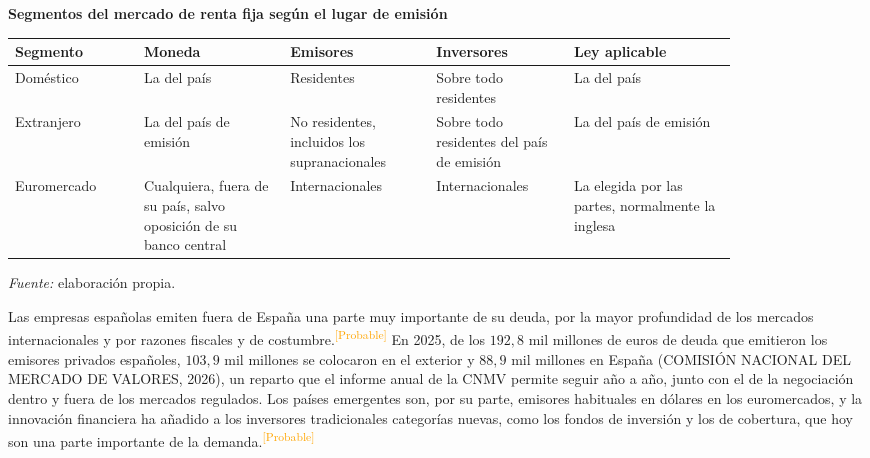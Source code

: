 \documentclass[10pt,a4paper]{article}
\begin{document}
\begin{center}\begin{minipage}{\linewidth}\centering
{\small\textbf{Segmentos del mercado de renta fija según el lugar de emisión}}\par\vspace{0.5em}
{\small\begin{tabular}{p{0.15\linewidth}p{0.17\linewidth}p{0.17\linewidth}p{0.16\linewidth}p{0.19\linewidth}}
\hline
\textbf{Segmento} & \textbf{Moneda} & \textbf{Emisores} & \textbf{Inversores} & \textbf{Ley aplicable}\tabularnewline
\hline
Doméstico & La del país & Residentes & Sobre todo residentes & La del país\tabularnewline
Extranjero & La del país de emisión & No residentes, incluidos los supranacionales & Sobre todo residentes del país de emisión & La del país de emisión\tabularnewline
Euromercado & Cualquiera, fuera de su país, salvo oposición de su banco central & Internacionales & Internacionales & La elegida por las partes, normalmente la inglesa\tabularnewline
\hline
\end{tabular}}\par\vspace{0.3em}
{\small\textit{Fuente: }elaboración propia.}
\end{minipage}\end{center}

Las empresas españolas emiten fuera de España una parte muy importante de su deuda, por la mayor profundidad de los mercados internacionales y por razones fiscales y de costumbre.\textcolor{orange}{\textsuperscript{[Probable]}} En 2025, de los $192{,}8$ mil millones de euros de deuda que emitieron los emisores privados españoles, $103{,}9$ mil millones se colocaron en el exterior y $88{,}9$ mil millones en España (COMISIÓN NACIONAL DEL MERCADO DE VALORES, 2026), un reparto que el informe anual de la CNMV permite seguir año a año, junto con el de la negociación dentro y fuera de los mercados regulados. Los países emergentes son, por su parte, emisores habituales en dólares en los euromercados, y la innovación financiera ha añadido a los inversores tradicionales categorías nuevas, como los fondos de inversión y los de cobertura, que hoy son una parte importante de la demanda.\textcolor{orange}{\textsuperscript{[Probable]}}
\end{document}
